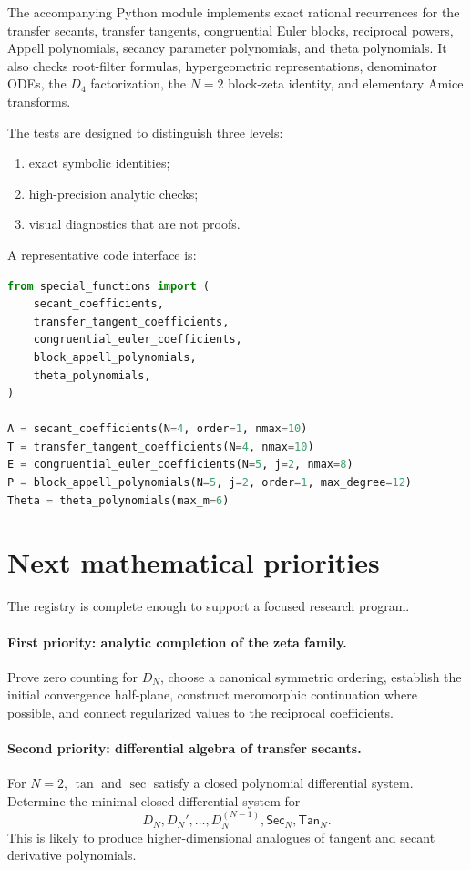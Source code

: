 \documentclass[11pt]{article}
\theoremstyle{definition}
\theoremstyle{remark}
\newcommand{\Sec}{\mathsf{Sec}}
\newcommand{\Tan}{\mathsf{Tan}}
\begin{document}
The accompanying Python module implements exact rational recurrences for the transfer secants, transfer tangents, congruential Euler blocks, reciprocal powers, Appell polynomials, secancy parameter polynomials, and theta polynomials.  It also checks root-filter formulas, hypergeometric representations, denominator ODEs, the $D_4$ factorization, the $N=2$ block-zeta identity, and elementary Amice transforms.

The tests are designed to distinguish three levels:
\begin{enumerate}
\item exact symbolic identities;
\item high-precision analytic checks;
\item visual diagnostics that are not proofs.
\end{enumerate}

A representative code interface is:
\begin{lstlisting}[language=Python]
from special_functions import (
    secant_coefficients,
    transfer_tangent_coefficients,
    congruential_euler_coefficients,
    block_appell_polynomials,
    theta_polynomials,
)

A = secant_coefficients(N=4, order=1, nmax=10)
T = transfer_tangent_coefficients(N=4, nmax=10)
E = congruential_euler_coefficients(N=5, j=2, nmax=8)
P = block_appell_polynomials(N=5, j=2, order=1, max_degree=12)
Theta = theta_polynomials(max_m=6)
\end{lstlisting}

\section{Next mathematical priorities}

The registry is complete enough to support a focused research program.

\paragraph{First priority: analytic completion of the zeta family.}
Prove zero counting for $D_N$, choose a canonical symmetric ordering, establish the initial convergence half-plane, construct meromorphic continuation where possible, and connect regularized values to the reciprocal coefficients.

\paragraph{Second priority: differential algebra of transfer secants.}
For $N=2$, $\tan$ and $\sec$ satisfy a closed polynomial differential system.  Determine the minimal closed differential system for
\[
D_N,D_N',\ldots,D_N^{(N-1)},\Sec_N,\Tan_N.
\]
This is likely to produce higher-dimensional analogues of tangent and secant derivative polynomials.
\end{document}
